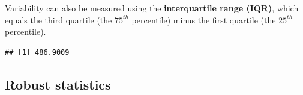





Variability can also be measured using the \textbf{interquartile range (IQR)}, which equals the third quartile (the $75^{th}$ percentile) minus the first quartile (the $25^{th}$ percentile). 

\begin{knitrout}
\color{fgcolor}\begin{kframe}
\begin{alltt}
\hlopt{$}
\end{alltt}
\begin{verbatim}
## [1] 486.9009
\end{verbatim}
\end{kframe}
\end{knitrout}

\subsection{Robust statistics}

